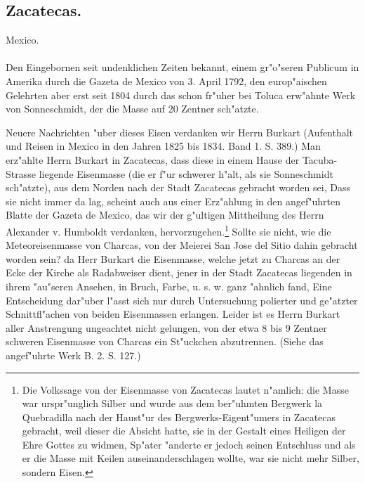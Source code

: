 \documentclass[a4paper, 11pt, oneside, polutonikogreek, german]{article}
\begin{document}
\subsection{Zacatecas.}
\begin{center}
\small
Mexico.
\end{center}
\paragraph{}
Den Eingebornen seit undenklichen Zeiten bekannt, einem gr"o"seren Publicum in Amerika durch die Gazeta de Mexico von 3. April 1792, den europ"aischen Gelehrten aber erst seit 1804 durch das schon fr"uher bei Toluca erw"ahnte Werk von Sonneschmidt, der die Masse auf 20 Zentner sch"atzte.

\setlength{\leftskip}{10mm}
\setlength{\parindent}{0pt}

{\footnotesize Neuere Nachrichten "uber dieses Eisen verdanken wir Herrn Burkart (Aufenthalt und Reisen in Mexico in den Jahren 1825 bis 1834. Band 1. S. 389.) Man erz"ahlte Herrn Burkart in Zacatecas, dass diese in einem Hause der Tacuba-Strasse liegende Eisenmasse (die er f"ur schwerer h"alt, als sie Sonneschmidt sch"atzte), aus dem Norden nach der Stadt Zacatecas gebracht worden sei, Dass sie nicht immer da lag, scheint auch aus einer Erz"ahlung in den angef"uhrten Blatte der Gazeta de Mexico, das wir der g"ultigen Mittheilung des Herrn Alexander v. Humboldt verdanken, hervorzugehen.\footnote{Die Volkssage von der Eisenmasse von Zacatecas lautet n"amlich: die Masse war urspr"unglich Silber und wurde aus dem ber"uhmten Bergwerk la Quebradilla nach der Haust"ur des Bergwerks-Eigent"umers in Zacatecas gebracht, weil dieser die Absicht hatte, sie in der Gestalt eines Heiligen der Ehre Gottes zu widmen, Sp"ater "anderte er jedoch seinen Entschluss und als er die Masse mit Keilen auseinanderschlagen wollte, war sie nicht mehr Silber, sondern Eisen.} Sollte sie nicht, wie die Meteoreisenmasse von Charcas, von der Meierei San Jose del Sitio dahin gebracht worden sein? da Herr Burkart die Eisenmasse, welche jetzt zu Charcas an der Ecke der Kirche als Radabweiser dient, jener in der Stadt Zacatecas liegenden in ihrem "au"seren Ansehen, in Bruch, Farbe, u. s. w. ganz "ahnlich fand, Eine Entscheidung dar"uber l"asst sich nur durch Untersuchung polierter und ge"atzter Schnittfl"achen von beiden Eisenmassen erlangen. Leider ist es Herrn Burkart aller Anstrengung ungeachtet nicht gelungen, von der etwa 8 bis 9 Zentner schweren Eisenmasse von Charcas ein St"uckchen abzutrennen. (Siehe das angef"uhrte Werk B. 2. S. 127.)}
\end{document}
